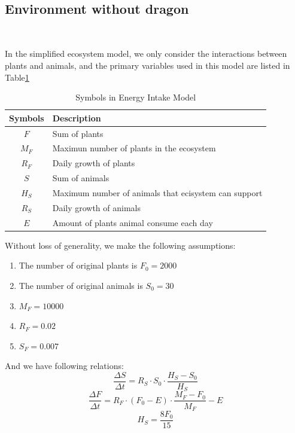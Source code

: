 \documentclass{mcmthesis}
\begin{document}
~\ \
\subsection{Environment without dragon}
~\ \

In the simplified ecosystem model, we only consider the interactions between plants and animals,
and the primary variables used in this model are listed in Table\ref{tb:Variables3}

\begin{table}[h]
\centering
\caption{Symbols in Energy Intake Model}
\begin{tabular}{cl}
\toprule
\textbf{Symbols}   & \textbf{Description}                                 \\
\midrule
$F$                & Sum of plants                                        \\
$M_{F}$            & Maximun number of plants in the ecosystem            \\
$R_{F}$            & Daily growth of plants                               \\
$S$                & Sum of animals                                       \\
$H_{S}$            & Maximum number of animals that ecisystem can support \\
$R_{S}$            & Daily growth of animals                              \\
$E$                & Amount of plants animal consume each day             \\
\bottomrule
\end{tabular}\label{tb:Variables3}
\end{table}

Without loss of generality, we make the following assumptions:
\begin{enumerate}
    \item The number of original plants is $F_{0}=2000$
    \item The number of original animals is $S_{0}=30$
    \item $M_{F}=10000$
    \item $R_{F}=0.02$
    \item $S_{F}=0.007$
\end{enumerate}

And we have following relations:
\begin{equation}
    \frac{\varDelta S}{\varDelta t}=R_{S}\cdot S_{0}\cdot \frac{H_{S}-S_{0}}{H_{S}}
\end{equation}
\begin{equation}
    \frac{\varDelta F}{\varDelta t}=R_{F}\cdot (F_{0}-E)\cdot \frac{M_{F}-F_{0}}{M_{F}}-E
\end{equation}
\begin{equation}
    H_{S}=\frac{8F_{0}}{15}
\end{equation}
\end{document}
